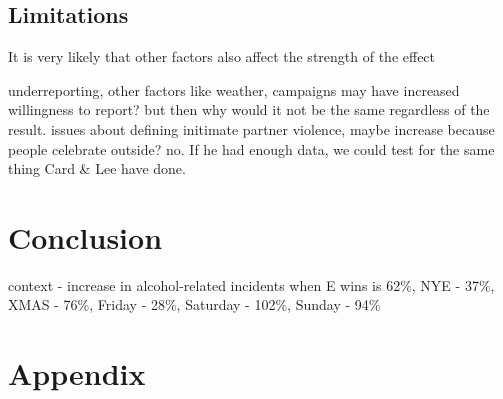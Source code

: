 \documentclass[12pt, letterpaper]{article}
\begin{document}




\subsection{Limitations}

It is very likely that other factors also affect the strength of the effect

underreporting, other factors like weather, campaigns may have increased willingness to report? but then why would it not be the same regardless of the result. issues about defining initimate partner violence, maybe increase because people celebrate outside? no.
If he had enough data, we could test for the same thing Card \& Lee have done.


\section{Conclusion}

context - increase in alcohol-related incidents when E wins is 62\%, NYE - 37\%, XMAS - 76\%, Friday - 28\%, Saturday - 102\%, Sunday - 94\%



\newpage

\section{Appendix}
\end{document}
